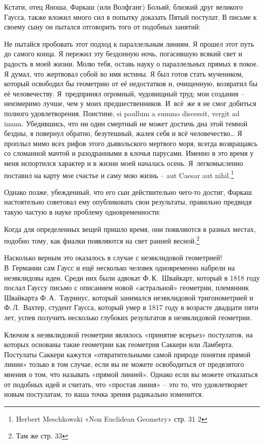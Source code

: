 \documentclass[../main.tex]{subfiles}
\begin{document}
Кстати, отец Яноша, Фаркаш (или Волфганг) Больяй, близкий друг великого Гаусса, также вложил много сил в попытку доказать Пятый постулат. В письме к своему сыну он пытался отговорить того от подобных занятий:
%
\begin{block}
Не пытайся пробовать этот подход к параллельным линиям. Я прошел этот путь до самого конца. Я пережил эту бездонную ночь, погасившую всякий свет и радость в моей жизни. Молю тебя, оставь науку о параллельных прямых в покое. Я думал, что жертвовал собой во имя истины. Я был готов стать мучеником, который освободил бы геометрию от её недостатков и, очищенную, возвратил бы её человечеству. Я~предпринял огромный, чудовищный труд; мои создания \--- неизмеримо лучше, чем у моих предшественников. И~всё~же я не смог добиться полного удовлетворения. Поистине, si paullum a summo discessit, vergit ad imum. Убедившись, что ни один смертный не может достичь дна этой темной бездны, я повернул обратно, безутешный, жалея себя и всё человечество\ldots{} Я проплыл мимо всех рифов этого дьявольского мертвого моря, всегда возвращаясь со сломанной мачтой и разодранными в клочья парусами. Именно в это время у меня испортился характер и в жизни моей началась осень. Я~легкомысленно поставил на карту мое счастье и саму мою жизнь \--- aut Caesar aut nihil.\footnote{Herbert Meschkowski «Non Euclidean Geometry» стр. 31 2}
\end{block}

Однако позже, убежденный, что его сын действительно чего-то достиг, Фаркаш настоятельно советовал ему опубликовать свои результаты, правильно предвидя такую частую в науке проблему одновременности:
%
\begin{block}
Когда для определенных вещей пришло время, они появляются в разных местах, подобно тому, как фиалки появляются на свет ранней весной.\footnote{Там же стр. 33}
\end{block}

Насколько верным это оказалось в случае с неэвклидовой геометрией! В~Германии сам Гаусс и ещё несколько человек одновременно набрели на неэвклидовы идеи. Среди них были адвокат Ф.\,К.~Швайкарт, который в 1818 году послал Гауссу письмо с описанием новой «астральной» геометрии, племянник Швайкарта Ф.\,А.~Тауринус, который занимался неэвклидовой тригонометрией и Ф.\,Л.~Вахтер, студент Гаусса, который умер в 1817 году в возрасте двадцати пяти лет, успев получить несколько глубоких результатов в неэвклидовой геометрии.

Ключом к неэвклидовой геометрии являлось «принятие всерьез» постулатов, на которых основаны такие геометрии как геометрия Саккери или Ламберта. Постулаты Саккери кажутся «отвратительными самой природе понятия прямой линии» только в том случае, если вы не можете освободиться от предвзятого мнения о том, что называть «прямой линией». Однако если вы можете отказаться от подобных идей и считать, что «простая линия» \--- это то, что удовлетворяет новым постулатам, то ваша точка зрения радикально изменится.
\end{document}
